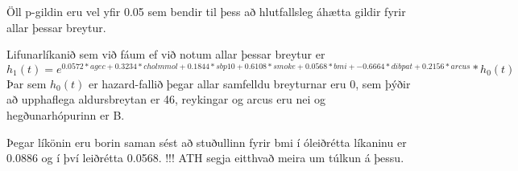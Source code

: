 \documentclass[
]{book}
\newenvironment{Shaded}{\begin{snugshade}}{\end{snugshade}}
\newcommand{\DecValTok}[1]{\textcolor[rgb]{0.00,0.00,0.81}{#1}}
\newcommand{\NormalTok}[1]{#1}
\newcommand{\OperatorTok}[1]{\textcolor[rgb]{0.81,0.36,0.00}{\textbf{#1}}}
\newcommand{\StringTok}[1]{\textcolor[rgb]{0.31,0.60,0.02}{#1}}
\begin{document}
\begin{Shaded}
\end{Shaded}

Öll p-gildin eru vel yfir 0.05 sem bendir til þess að hlutfallsleg áhætta gildir fyrir allar þessar breytur.

Lifunarlíkanið sem við fáum ef við notum allar þessar breytur er \(h_{1}(t)=e^{0.0572*agec+0.3234*cholmmol+0.1844*sbp10+0.6108*smoke+0.0568*bmi+-0.6664*dibpat +0.2156*arcus}*h_{0}(t)\) Þar sem \(h_{0}(t)\) er hazard-fallið þegar allar samfelldu breyturnar eru 0, sem þýðir að upphaflega aldursbreytan er 46, reykingar og arcus eru nei og hegðunarhópurinn er B.

Þegar líkönin eru borin saman sést að stuðullinn fyrir bmi í óleiðrétta líkaninu er 0.0886 og í því leiðrétta 0.0568. !!! ATH segja eitthvað meira um túlkun á þessu.

  
\end{document}
